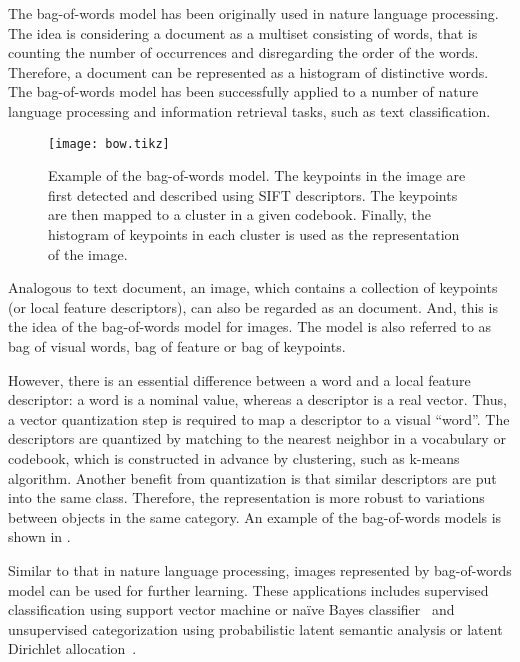 \documentclass[12pt,final,twoside]{report}
\begin{document}
The bag-of-words model has been originally used in nature language processing. The idea is considering a document as a multiset consisting of words, that is counting the number of occurrences and disregarding the order of the words. Therefore, a document can be represented as a histogram of distinctive words. The bag-of-words model has been successfully applied to a number of nature language processing and information retrieval tasks, such as text classification.

\begin{figure}[t]
  \centering
  \texttt{[image: bow.tikz]}
  \caption[Example of the bag-of-words model.]{Example of the bag-of-words model. The keypoints in the image are first detected and described using SIFT descriptors. The keypoints are then mapped to a cluster in a given codebook. Finally, the histogram of keypoints in each cluster is used as the representation of the image.}
  \label{fig:bow}
\end{figure}

Analogous to text document, an image, which contains a collection of keypoints (or local feature descriptors), can also be regarded as an document. And, this is the idea of the bag-of-words model for images. The model is also referred to as bag of visual words, bag of feature or bag of keypoints. 

However, there is an essential difference between a word and a local feature descriptor: a word is a nominal value, whereas a descriptor is a real vector. Thus, a vector quantization step is required to map a descriptor to a visual ``word''. The descriptors are quantized by matching to the nearest neighbor in a vocabulary or codebook, which is constructed in advance by clustering, such as k-means algorithm. Another benefit from quantization is that similar descriptors are put into the same class. Therefore, the representation is more robust to variations between objects in the same category. An example of the bag-of-words models is shown in .

Similar to that in nature language processing, images represented by bag-of-words model can be used for further learning. These applications includes supervised classification using support vector machine or na\"ive Bayes classifier~\cite{csurka_visual_2004} and unsupervised categorization using probabilistic latent semantic analysis or latent Dirichlet allocation~\cite{sivic_discovering_2005}.
\end{document}
